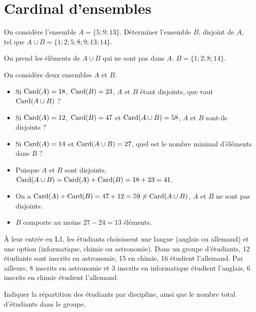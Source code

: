 \documentclass[11pt,fleqn, openany]{book} %
\begin{document}
\section*{Cardinal d'ensembles}

\begin{exercise}[topic=comb01]On considère l'ensemble $A=\{5;9;13\}$. Déterminer l'ensemble $B$, disjoint de $A$, tel que $A\cup B =\{1;2;5;8;9;13;14\}$.\end{exercise}

\begin{solution} On prend les éléments de $A \cup B$ qui ne sont pas dans $A$. $B=\{1;2;8;14\}$.\end{solution}


\begin{exercise}[topic=comb01]On considère deux ensembles $A$ et $B$.
\begin{itemize}
\item Si $\mathrm{Card}(A)=18$, $\mathrm{Card}(B)=23$, $A$ et $B$ étant disjoints, que vaut $\mathrm{Card}(A \cup B)$ ?
\item Si $\mathrm{Card}(A)=12$, $\mathrm{Card}(B)=47$ et $\mathrm{Card}(A \cup B) = 58$, $A$ et $B$ sont-ils disjoints ?
\item Si $\mathrm{Card}(A)=14$ et $\mathrm{Card}(A \cup B) = 27$, quel est le nombre minimal d'éléments dans $B$ ?
\end{itemize}\end{exercise}

\begin{solution}\hspace{0pt}
\begin{itemize}
\item Puisque $A$ et $B$ sont disjoints, $\mathrm{Card}(A \cup B)=\mathrm{Card}(A) + \mathrm{Card}(B) = 18 + 23 = 41$.
\item On a $\mathrm{Card}(A)+\mathrm{Card}(B)=47+12=59 \neq \mathrm{Card}(A \cup B)$, $A$ et $B$ ne sont pas disjoints.
\item $B$ comporte au moins $27-24=13$ éléments.\end{itemize}
\end{solution}



\begin{exercise}[topic=comb01]À leur entrée en L1, les étudiants choisissent une langue (anglais ou allemand) et une option (informatique, chimie ou astronomie). Dans un groupe d'étudiants, 12 étudiants sont inscrits en astronomie, 15 en chimie, 16 étudient l'allemand. Par ailleurs, 8 inscrits en astronomie et 3 inscrits en informatique étudient l'anglais, 6 inscrits en chimie étudient l'allemand.

Indiquer la répartition des étudiants par discipline, ainsi que le nombre total d'étudiants dans le groupe.\end{exercise}
\end{document}
